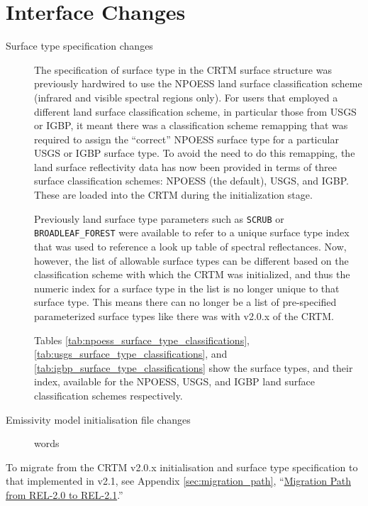 \section*{Interface Changes}
\label{sec:new_interface_changes}

\begin{description}
\item[Surface type specification changes] The specification of surface type in the CRTM surface structure was previously hardwired to use the NPOESS land surface classification scheme (infrared and visible spectral regions only). For users that employed a different land surface classification scheme, in particular those from USGS or IGBP, it meant there was a classification scheme remapping that was required to assign the ``correct'' NPOESS surface type for a particular USGS or IGBP surface type. To avoid the need to do this remapping, the land surface reflectivity data has now been provided in terms of three surface classification schemes: NPOESS (the default), USGS, and IGBP. These are loaded into the CRTM during the initialization stage.

Previously land surface type parameters such as \texttt{SCRUB} or \texttt{BROADLEAF\_FOREST} were available to refer to a unique surface type index that was used to reference a look up table of spectral reflectances. Now, however, the list of allowable surface types can be different based on the classification scheme with which the CRTM was initialized, and thus the numeric index for a surface type in the list is no longer unique to that surface type. This means there can no longer be a list of pre-specified parameterized surface types like there was with v2.0.x of the CRTM.

Tables \ref{tab:npoess_surface_type_classifications}, \ref{tab:usgs_surface_type_classifications}, and \ref{tab:igbp_surface_type_classifications} show the surface types, and their index, available for the NPOESS, USGS, and IGBP land surface classification schemes respectively.



\item[Emissivity model initialisation file changes] words

\end{description}


To migrate from the CRTM v2.0.x initialisation and surface type specification to that implemented in v2.1, see Appendix \ref{sec:migration_path}, ``\hyperref[sec:migration_path]{Migration Path from REL-2.0 to REL-2.1}.''


